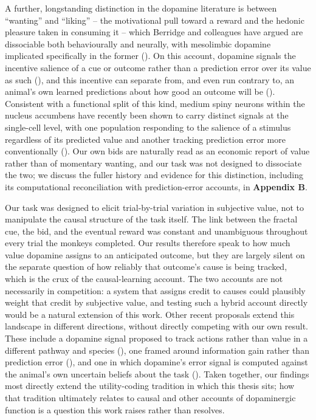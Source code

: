 A further, longstanding distinction in the dopamine literature is between ``wanting'' and ``liking'' -- the motivational pull toward a reward and the hedonic pleasure taken in consuming it -- which Berridge and colleagues have argued are dissociable both behaviourally and neurally, with mesolimbic dopamine implicated specifically in the former (\cite{robinsonIncentiveSensitizationTheoryAddiction2025}). On this account, dopamine signals the incentive salience of a cue or outcome rather than a prediction error over its value as such (\cite{berridgePredictionErrorIncentive2012}), and this incentive can separate from, and even run contrary to, an animal's own learned predictions about how good an outcome will be (\cite{berridgeSeparatingDesirePrediction2023}). Consistent with a functional split of this kind, medium spiny neurons within the nucleus accumbens have recently been shown to carry distinct signals at the single-cell level, with one population responding to the salience of a stimulus regardless of its predicted value and another tracking prediction error more conventionally (\cite{zachryD1D2Medium2024}). Our own bids are naturally read as an economic report of value rather than of momentary wanting, and our task was not designed to dissociate the two; we discuss the fuller history and evidence for this distinction, including its computational reconciliation with prediction-error accounts, in \textbf{Appendix B}.

Our task was designed to elicit trial-by-trial variation in subjective value, not to manipulate the causal structure of the task itself. The link between the fractal cue, the bid, and the eventual reward was constant and unambiguous throughout every trial the monkeys completed. Our results therefore speak to how much value dopamine assigns to an anticipated outcome, but they are largely silent on the separate question of how reliably that outcome's cause is being tracked, which is the crux of the causal-learning account. The two accounts are not necessarily in competition: a system that assigns credit to causes could plausibly weight that credit by subjective value, and testing such a hybrid account directly would be a natural extension of this work. Other recent proposals extend this landscape in different directions, without directly competing with our own result. These include a dopamine signal proposed to track actions rather than value in a different pathway and species (\cite{greenstreetDopaminergicActionPrediction2025}), one framed around information gain rather than prediction error (\cite{beckPredictionErrorCorrelates2026}), and one in which dopamine's error signal is computed against the animal's own uncertain beliefs about the task (\cite{starkweatherDopamineRewardPrediction2017}). Taken together, our findings most directly extend the utility-coding tradition in which this thesis sits; how that tradition ultimately relates to causal and other accounts of dopaminergic function is a question this work raises rather than resolves.

